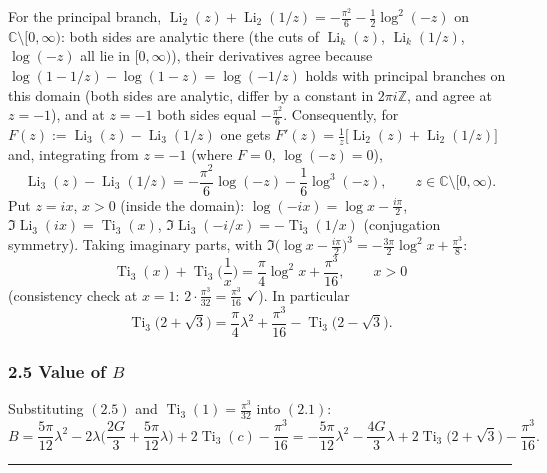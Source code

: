 \documentclass[11pt]{article}
\theoremstyle{remark}
\begin{document}
For the principal branch, $\operatorname{Li}_2(z)+\operatorname{Li}_2(1/z)=-\frac{\pi^2}{6}-\frac12\log^2(-z)$ on $\mathbb C\setminus[0,\infty)$: both sides are analytic there (the cuts of $\operatorname{Li}_k(z)$, $\operatorname{Li}_k(1/z)$, $\log(-z)$ all lie in $[0,\infty)$), their derivatives agree because $\log(1-1/z)-\log(1-z)=\log(-1/z)$ holds with principal branches on this domain (both sides are analytic, differ by a constant in $2\pi i\mathbb Z$, and agree at $z=-1$), and at $z=-1$ both sides equal $-\frac{\pi^2}{6}$. Consequently, for
$F(z):=\operatorname{Li}_3(z)-\operatorname{Li}_3(1/z)$ one gets $F'(z)=\frac1z\big[\operatorname{Li}_2(z)+\operatorname{Li}_2(1/z)\big]$ and, integrating from $z=-1$ (where $F=0$, $\log(-z)=0$),
\[
\operatorname{Li}_3(z)-\operatorname{Li}_3(1/z)=-\frac{\pi^2}{6}\log(-z)-\frac16\log^3(-z),\qquad z\in\mathbb C\setminus[0,\infty).
\]
Put $z=ix$, $x>0$ (inside the domain): $\log(-ix)=\log x-\frac{i\pi}{2}$, $\Im\operatorname{Li}_3(ix)=\operatorname{Ti}_3(x)$, $\Im\operatorname{Li}_3(-i/x)=-\operatorname{Ti}_3(1/x)$ (conjugation symmetry). Taking imaginary parts, with $\Im\big(\log x-\frac{i\pi}2\big)^3=-\frac{3\pi}{2}\log^2x+\frac{\pi^3}{8}$:
\begin{equation*}
\operatorname{Ti}_3(x)+\operatorname{Ti}_3\!\Big(\frac1x\Big)=\frac{\pi}{4}\log^2x+\frac{\pi^3}{16},\qquad x>0 \tag{2.6}
\end{equation*}
(consistency check at $x=1$: $2\cdot\frac{\pi^3}{32}=\frac{\pi^3}{16}$ $\checkmark$). In particular
\begin{equation*}
\operatorname{Ti}_3\!\big(2+\sqrt3\big)=\frac{\pi}{4}\lambda^2+\frac{\pi^3}{16}-\operatorname{Ti}_3\!\big(2-\sqrt3\big). \tag{2.7}
\end{equation*}

\subsubsection*{2.5 Value of $B$}

Substituting $(2.5)$ and $\operatorname{Ti}_3(1)=\frac{\pi^3}{32}$ into $(2.1)$:
\begin{equation*}
B=\frac{5\pi}{12}\lambda^2-2\lambda\Big(\frac{2G}{3}+\frac{5\pi}{12}\lambda\Big)+2\operatorname{Ti}_3(c)-\frac{\pi^3}{16}
=-\frac{5\pi}{12}\lambda^2-\frac{4G}{3}\lambda+2\operatorname{Ti}_3\!\big(2+\sqrt3\big)-\frac{\pi^3}{16}. \tag{2.8}
\end{equation*}

\begin{center}\rule{0.6\textwidth}{0.4pt}\end{center}
\end{document}
